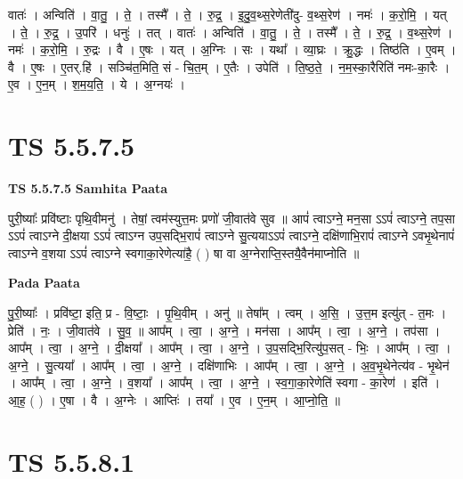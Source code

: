 \documentclass[17pt]{extarticle}
\begin{document}
वातः॑ । अन्विति॑ । वा॒तु॒ । ते॒ । तस्मै᳚ । ते॒ । रु॒द्र॒ । इ॒दु॒व॒थ्स॒रेणेती॑दु- व॒थ्स॒रेण॑ । नमः॑ । क॒रो॒मि॒ । यत् । ते॒ । रु॒द्र॒ । उ॒परि॑ । धनुः॑ । तत् । वातः॑ । अन्विति॑ । वा॒तु॒ । ते॒ । तस्मै᳚ । ते॒ । रु॒द्र॒ । व॒थ्स॒रेण॑ । नमः॑ । क॒रो॒मि॒ । रु॒द्रः । वै । ए॒षः । यत् । अ॒ग्निः । सः । यथा᳚ । व्या॒घ्रः । क्रु॒द्धः । तिष्ठ॑ति । ए॒वम् । वै । ए॒षः । ए॒तर्.हि॑ । सञ्चि॑त॒मिति॒ सं - चि॒त॒म् । ए॒तैः । उपेति॑ । ति॒ष्ठ॒ते॒ । न॒म॒स्का॒रैरिति॑ नमः-का॒रैः । ए॒व । ए॒न॒म् । श॒म॒य॒ति॒ । ये । अ॒ग्नयः॑ ।  \newline





\section{ TS 5.5.7.5 }

\textbf{TS 5.5.7.5 } \newline
\textbf{Samhita Paata} \newline

पुरी॒ष्याः᳚ प्रवि॑ष्टाः पृथि॒वीमनु॑ । तेषां॒ त्वम॑स्युत्त॒मः प्रणो॑ जी॒वात॑वे सुव ॥ आपं॑ त्वाऽग्ने॒ मन॒सा ऽऽपं॑ त्वाऽग्ने॒ तप॒सा ऽऽपं॑ त्वाऽग्ने दी॒क्षया ऽऽपं॑ त्वाऽग्न उप॒सद्भि॒रापं॑ त्वाऽग्ने सु॒त्ययाऽऽपं॑ त्वाऽग्ने॒ दक्षि॑णाभि॒रापं॑ त्वाऽग्ने ऽवभृ॒थेनापं॑ त्वाऽग्ने व॒शया ऽऽपं॑ त्वाऽग्ने स्वगाका॒रेणेत्या॑है॒ ( ) षा वा अ॒ग्नेराप्ति॒स्तयै॒वैन॑माप्नोति ॥ \newline

\textbf{Pada Paata} \newline

पु॒री॒ष्याः᳚ । प्रवि॑ष्टा॒ इति॒ प्र - वि॒ष्टाः॒ । पृ॒थि॒वीम् । अनु॑ ॥ तेषा᳚म् । त्वम् । अ॒सि॒ । उ॒त्त॒म इत्यु॑त् - त॒मः । प्रेति॑ । नः॒ । जी॒वात॑वे । सु॒व॒ ॥ आप᳚म् । त्वा॒ । अ॒ग्ने॒ । मन॑सा । आप᳚म् । त्वा॒ । अ॒ग्ने॒ । तप॑सा । आप᳚म् । त्वा॒ । अ॒ग्ने॒ । दी॒क्षया᳚ । आप᳚म् । त्वा॒ । अ॒ग्ने॒ । उ॒प॒सद्भि॒रित्यु॑प॒सत् - भिः॒ । आप᳚म् । त्वा॒ । अ॒ग्ने॒ । सु॒त्यया᳚ । आप᳚म् । त्वा॒ । अ॒ग्ने॒ । दक्षि॑णाभिः । आप᳚म् । त्वा॒ । अ॒ग्ने॒ । अ॒व॒भृ॒थेनेत्य॑व - भृ॒थेन॑ । आप᳚म् । त्वा॒ । अ॒ग्ने॒ । व॒शया᳚ । आप᳚म् । त्वा॒ । अ॒ग्ने॒ । स्व॒गा॒का॒रेणेति॑ स्वगा - का॒रेण॑ । इति॑ । आ॒ह॒ ( ) । ए॒षा । वै । अ॒ग्नेः । आप्तिः॑ । तया᳚ । ए॒व । ए॒न॒म् । आ॒प्नो॒ति॒ ॥  \newline





\section{ TS 5.5.8.1 }
\end{document}
